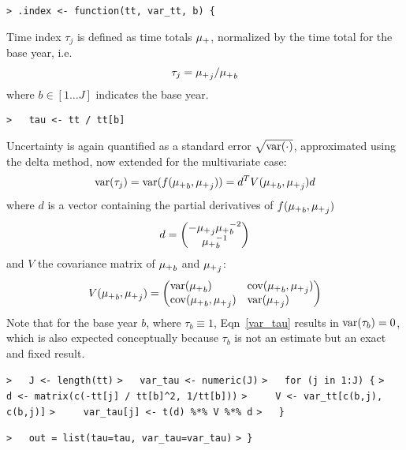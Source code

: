 \documentclass[a4paper]{article}
\begin{document}
\verb~> .index <- function(tt, var_tt, b) {~\par

Time index $\tau_j$ is defined as time totals ${\mu_{+}}$, normalized by the time total for the base
year, i.e.\,
$$ \tau_j = {\mu_{+}}_j / {\mu_{+}}_b $$
where $b\in[1\ldots J]$ indicates the base year.\par
\verb~>   tau <- tt / tt[b]~\par

Uncertainty is again quantified as a standard error $\sqrt{\operatorname{var}(\cdot)}$,
approximated using the delta method, now extended for the multivariate case:
\begin{equation}
  \operatorname{var}(\tau_j) = \operatorname{var}(f({\mu_{+}}_b,{\mu_{+}}_j)) = d^T V({\mu_{+}}_b,{\mu_{+}}_j) d \label{var_tau}
\end{equation}
where $d$ is a vector containing the partial derivatives of $f({\mu_{+}}_b,{\mu_{+}}_j)$
\begin{equation}
  d = \begin{pmatrix} -{\mu_{+}}_j {\mu_{+}}_b^{-2} \\ {\mu_{+}}_b^{-1} \end{pmatrix}
\end{equation}
and $V$ the covariance matrix of ${\mu_{+}}_b$ and ${\mu_{+}}_j$:
\begin{equation}
  V(\Mu_b,\Mu_j) = \begin{pmatrix*}[l]
    \var{\Mu_b} & \cov{\Mu_b, \Mu_j} \\
    \cov{\Mu_b, \Mu_j} & \var{\Mu_j}
  \end{pmatrix*}
\end{equation}
Note that for the base year $b$, where $\tau_b\equiv1$, Eqn~\eqref{var_tau} results in
$\operatorname{var}(\tau_b)=0$, which is also expected conceptually because $\tau_b$ is not an estimate but an exact and fixed result.\par
\verb~>   J <- length(tt)~\newline
\verb~>   var_tau <- numeric(J)~\newline
\verb~>   for (j in 1:J) {~\newline
\verb~>     d <- matrix(c(-tt[j] / tt[b]^2, 1/tt[b]))~\newline
\verb~>     V <- var_tt[c(b,j), c(b,j)]~\newline
\verb~>     var_tau[j] <- t(d) %*% V %*% d~\newline
\verb~>   }~\par

\verb~>   out = list(tau=tau, var_tau=var_tau)~\newline
\verb~> }~\par
\end{document}
